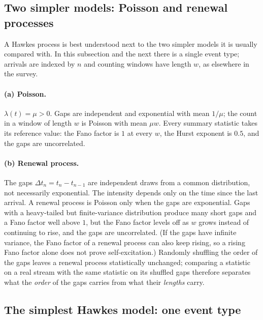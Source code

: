 \subsection{Two simpler models: Poisson and renewal processes}
\label{sec:pp-canon}

A Hawkes process is best understood next to the two simpler models it is usually compared with. In this
subsection and the next there is a single event type; arrivals are indexed by $n$ and counting windows have
length $w$, as elsewhere in the survey.

\paragraph{(a) Poisson.} $\lambda(t) = \mu > 0$. Gaps are independent and exponential with mean
$1/\mu$; the count in a window of length $w$ is Poisson with mean $\mu w$. Every summary statistic
takes its reference value: the Fano factor is $1$ at every $w$, the Hurst exponent is $0.5$, and the
gaps are uncorrelated.

\paragraph{(b) Renewal process.} The gaps $\Delta t_n = t_n - t_{n-1}$ are independent draws from a common
distribution, not necessarily exponential. The intensity depends only on the time since the last
arrival. A renewal process is Poisson only when the gaps are exponential. Gaps with a heavy-tailed but finite-variance distribution produce
many short gaps and a Fano factor well above $1$, but the Fano factor levels off as $w$ grows instead
of continuing to rise, and the gaps are uncorrelated. (If the gaps have infinite variance, the Fano
factor of a renewal process can also keep rising, so a rising Fano factor alone does not prove
self-excitation.) Randomly shuffling the order of the gaps leaves
a renewal process statistically unchanged; comparing a statistic on a real stream with the same
statistic on its shuffled gaps therefore separates what the \emph{order} of the gaps carries from
what their \emph{lengths} carry.

\subsection{The simplest Hawkes model: one event type}
\label{sec:hawkes-one}

